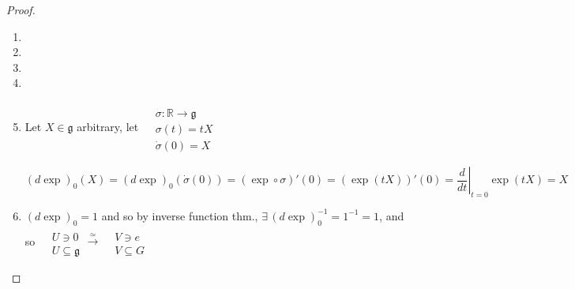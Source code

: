 \documentclass[11pt]{amsart}
\theoremstyle{definition}
\begin{document}
\begin{proof}
\begin{enumerate}
\item[(a)]
\item[(b)]
\item[(c)]
\item[(d)]
\item[(e)] Let $X\in \mathfrak{g}$ arbitrary, let $\begin{aligned} & \quad \\
  & \sigma: \mathbb{R} \to \mathfrak{g} \\
  & \sigma(t) = tX \\
  & \dot{\sigma}(0) = X \end{aligned}$





\[
(d\exp )_0(X) = (d\exp )_0(\dot{\sigma}(0)) = (\exp \circ \sigma)'(0) = (\exp{ (tX)})'(0) = \left. \frac{d}{dt} \right|_{t=0} \exp{ (tX)}= X
\]
\item[(f)] $(d\exp )_0 =1$ and so by inverse function thm., $\exists \, (d\exp)_0^{-1}=1^{-1}=1$, and so $\begin{aligned} & \quad \\
  & U \ni 0 \\
  & U \subseteq \mathfrak{g} \end{aligned} \xrightarrow{ \simeq } \begin{aligned} & \quad \\
  & V \ni e \\
  & V \subseteq G \end{aligned}$
\end{enumerate}









\end{proof}
\end{document}
